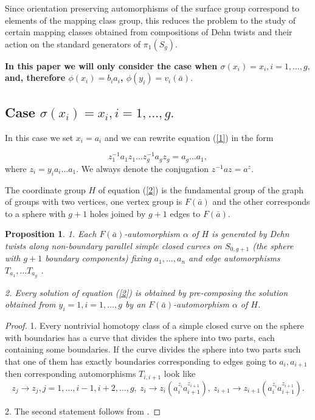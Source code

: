 \documentclass{article}
\newtheorem{prop}[theorem]{Proposition}
\begin{document}
 Since
orientation preserving automorphisms of the surface group correspond to
elements of the mapping class group, this reduces the problem to the study of
certain mapping classes obtained from compositions of Dehn twists and their action on the standard generators of $\pi_1(S_g)$. 

{\bf In this paper we will only consider the case  when $\sigma (x_i)=x_i, i=1,\ldots ,g,$ and, therefore $\phi (x_i)=b_ia_i$, $ \phi (y_i)=v_i(\bar a).$}




\subsection{Case  $\sigma (x_i)=x_i, i=1,\ldots ,g.$}


In this case we set $x_i=a_i$ and we can rewrite equation  (\ref {1}) in the form

 \begin{equation}\label{2}
 z_1^{-1}a_1z_1\ldots z_g^{-1}a_gz_g=a_g\ldots a_1,
 \end{equation}
 where $z_i=y_ia_i\ldots a_1.$ We always denote the conjugation $z^{-1}az=a^z.$

 The coordinate group $H$ of equation (\ref {2}) is the fundamental group of the graph of groups with two vertices, one vertex group is $F(\bar a)$ and the other  corresponds to  a sphere with $g+1$ holes joined by $g+1$  edges to  $F(\bar a)$. 
  \begin{prop} \label {l3} 1. Each $F(\bar a)$-automorphism $\alpha$ of $H$   is generated by  Dehn twists along non-boundary parallel simple closed curves on $S_{0,g+1}$ (the sphere with \(g+1\) boundary components) fixing $a_1,\ldots ,a_n$ and edge automorphisms  $T_{a_1},\ldots T_{a_g}$ \cite[Theorem 5.1]{BKM}.
 
 2. Every solution of  equation (\ref {2}) is obtained by pre-composing the solution obtained from $y_i=1, i=1,\ldots ,g$ by an  $F(\bar a)$-automorphism $\alpha$ of $H$.  


\end{prop} 
\begin{proof}
1. Every nontrivial homotopy class of a simple closed curve on the sphere with boundaries
has a curve that divides the sphere into two parts, each containing some boundaries. 
If the curve divides the sphere into two parts such that one of them has exactly boundaries corresponding to edges going to $a_i, a_{i+1}$ then corresponding automorphisms $T_{i,i+1}$ look like
$$z_j\rightarrow z_j, j=1,\ldots ,i-1,i+2,\ldots ,g,\  z_i\rightarrow z_i(a_i^{z_i}a_{i+1}^{z_{i+1}}), \  z_{i+1}\rightarrow z_{i+1}(a_i^{z_i}a_{i+1}^{z_{i+1}}).$$


2.  The second statement follows from \cite{GK1}.  
\end{proof} 
\vspace{.5cm}
\end{document}
